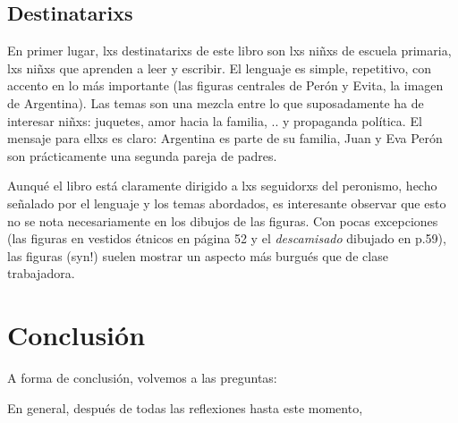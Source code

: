 \documentclass[
10pt, %
a4paper, %
oneside, %
headinclude,footinclude, %
]{scrartcl}
\begin{document}
\subsection{Destinatarixs}

En primer lugar, lxs destinatarixs de este libro son lxs niñxs de escuela primaria, lxs niñxs que aprenden a leer y escribir.
El lenguaje es simple, repetitivo, con accento en lo más importante (las figuras centrales de Perón y Evita, la imagen de Argentina).
Las temas son una mezcla entre lo que suposadamente ha de interesar niñxs: juquetes, amor hacia la familia, .. y propaganda política.
El mensaje para ellxs es claro: Argentina es parte de su familia, Juan y Eva Perón son prácticamente una segunda pareja de padres.

Aunqué el libro está claramente dirigido a lxs seguidorxs del peronismo,
hecho señalado por el lenguaje y los temas abordados,
es interesante observar que esto no se nota necesariamente en los dibujos de las figuras.
Con pocas excepciones (las figuras en vestidos étnicos en página 52 y el \textit{descamisado} dibujado en p.59),
las figuras (syn!) suelen mostrar un aspecto más burgués que de clase trabajadora.

\section{Conclusión}

A forma de conclusión, volvemos a las preguntas:

En general, después de todas las reflexiones hasta este momento,

\renewcommand{\refname}{\spacedlowsmallcaps{Referencias}} %

\nocite{*}
%
%
%

\printbibliography
\end{document}
